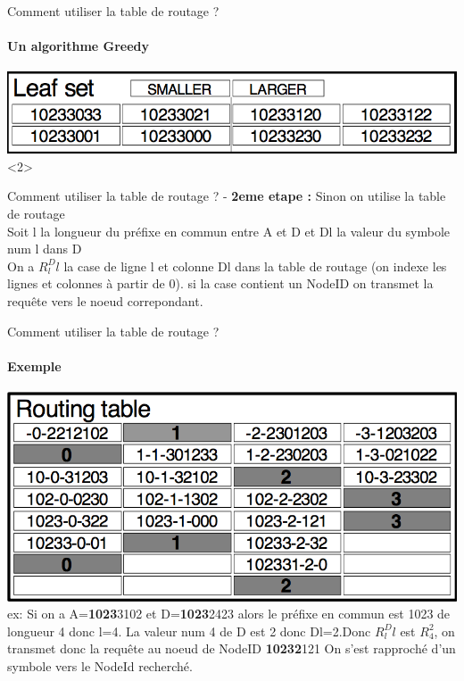 \documentclass[french]{beamer}
\begin{document}
\begin{frame}{Comment utiliser la table de routage ?}
\framesubtitle{Un algorithme Greedy}
	\includegraphics[scale=0.35]{"Leaf_set"}<2>
\end{frame}
\begin{frame}{Comment utiliser la table de routage ?}
	-\textbf{ 2eme etape : } Sinon on utilise la table de routage\\Soit l la longueur du préfixe en commun entre A et D et Dl la valeur du symbole num l dans D\\On a $ R_l^Dl $ la case de ligne l et colonne Dl dans la table de routage (on indexe les lignes et colonnes à partir de 0). si la case contient un NodeID on transmet la requête vers le noeud correpondant. 
\end{frame}
\begin{frame}{Comment utiliser la table de routage ?}
\framesubtitle{Exemple}
	\includegraphics[scale=0.35]{"table_routage"}
ex: Si on a A=\textbf{1023}3102 et D=\textbf{1023}2423 alors le préfixe en commun est 1023 de longueur 4 donc l=4. La valeur num 4 de D est 2 donc  Dl=2.Donc $ R_l^Dl $ est $ R^2_4 $, on transmet donc la requête au noeud de NodeID \textbf{10232}121 On s'est rapproché d'un symbole vers le NodeId recherché.
\end{frame}
\end{document}
